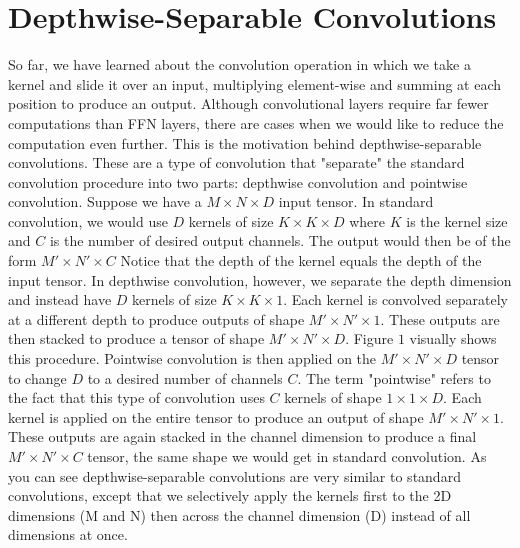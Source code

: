 \documentclass{article}
\begin{document}
\section{Depthwise-Separable Convolutions}
So far, we have learned about the convolution operation in which we take a kernel and slide it over an input, multiplying element-wise and summing at each position to produce an output. Although convolutional layers require far fewer computations than FFN layers, there are cases when we would like to reduce the computation even further. This is the motivation behind depthwise-separable convolutions. These are a type of convolution that "separate" the standard convolution procedure into two parts: depthwise convolution and pointwise convolution. \newline\newline
Suppose we have a $M\times N\times D$ input tensor. In standard convolution, we would use $D$ kernels of size $K\times K \times D$ where $K$ is the kernel size and $C$ is the number of desired output channels. The output would then be of the form $M'\times N' \times C$  Notice that the depth of the kernel equals the depth of the input tensor. In depthwise convolution, however, we separate the depth dimension and instead have $D$ kernels of size $K\times K \times 1$. Each kernel is convolved separately at a different depth to produce outputs of shape $M' \times N' \times 1$. These outputs are then stacked to produce a tensor of shape $M'\times N' \times D$. Figure $1$ visually shows this procedure. 
\newline\newline
Pointwise convolution is then applied on the $M'\times N' \times D$ tensor to change $D$ to a desired number of channels $C$. The term "pointwise" refers to the fact that this type of convolution uses $C$ kernels of shape $1\times 1 \times D$. Each kernel is applied on the entire tensor to produce an output of shape $M'\times N' \times 1$. These outputs are again stacked in the channel dimension to produce a final $M'\times N' \times C$ tensor, the same shape we would get in standard convolution. As you can see depthwise-separable convolutions are very similar to standard convolutions, except that we selectively apply the kernels first to the 2D dimensions (M and N) then across the channel dimension (D) instead of all dimensions at once.
\end{document}
